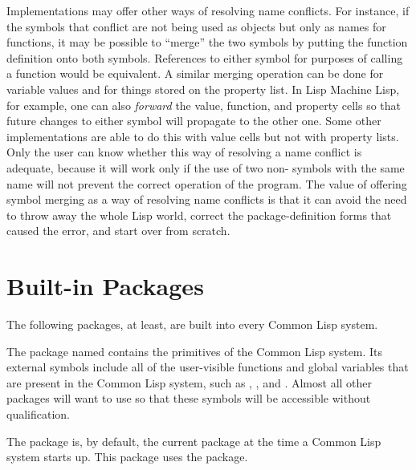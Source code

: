 Implementations may offer other ways of resolving name conflicts.
For instance, if the symbols that conflict are not being used as
objects but only as names for functions, it may be possible to ``merge''
the two symbols by putting the function definition onto both symbols.
References to either symbol for purposes of calling a function would be
equivalent.  A similar merging operation can be done for variable values
and for things stored on the property list.  In Lisp Machine Lisp, for example, one can
also {\it forward} the value, function, and property cells so that future
changes to either symbol will propagate to the other one.  Some other
implementations are able to do this with value cells but not with
property lists.  Only the user can know whether this way of resolving
a name conflict is adequate, because it will work only if
the use of two non-
symbols with the same name will not prevent the correct operation of
the program.  The value of offering symbol merging as a way of resolving
name conflicts is that it can avoid the need to throw away the whole
Lisp world, correct the package-definition forms
that caused the error, and start over from scratch.

\section{Built-in Packages}

\begin{obsolete}
\noindent
The following packages, at least, are built into every Common Lisp system.

\begin{flushdesc}
\item[\cdf{lisp}]
The package named  contains the primitives of the
Common Lisp system.  Its external symbols include all of the
user-visible functions and global variables that are present in the
Common Lisp system, such as , , and .
Almost all other packages will want to use  so that these
symbols will be accessible without qualification.

\item[\cdf{user}]
The  package is, by default, the current package at the time
a Common Lisp system starts up.  This package uses the  package.
\end{flushdesc}
\end{obsolete}

